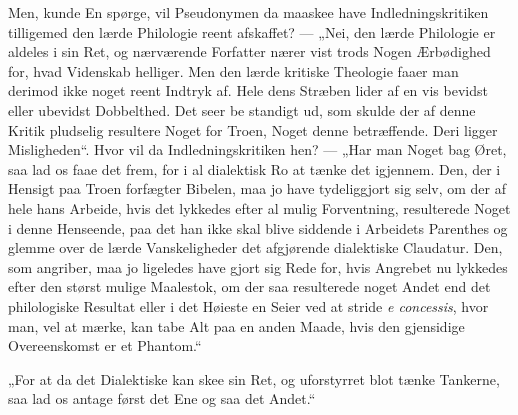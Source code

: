 Men, kunde En spørge, vil Pseudonymen da maaskee have
Indledningskritiken tilligemed den lærde Philologie reent
afskaffet? --- „Nei, den lærde Philologie er aldeles i sin Ret, og
nærværende Forfatter nærer vist trods Nogen Ærbødighed for, hvad
Videnskab helliger. Men den lærde kritiske Theologie faaer man
derimod ikke noget reent Indtryk af. Hele dens Stræben lider af en
vis bevidst eller ubevidst Dobbelthed. Det seer be%
standigt ud, som skulde der af denne Kritik pludselig resultere
Noget for Troen, Noget denne betræffende. Deri ligger
Misligheden“. Hvor vil da Indledningskritiken hen? --- „Har man
Noget bag Øret, saa lad os faae det frem, for i al dialektisk Ro
at tænke det igjennem. Den, der i Hensigt paa Troen forfægter
Bibelen, maa jo have tydeliggjort sig selv, om der af hele hans
Arbeide, hvis det lykkedes efter al mulig Forventning,
resulterede Noget i denne Henseende, paa det han ikke skal blive
siddende i Arbeidets Parenthes og glemme over de lærde
Vanskeligheder det afgjørende dialektiske Claudatur. Den, som
angriber, maa jo ligeledes have gjort sig Rede for, hvis Angrebet
nu lykkedes efter den størst mulige Maalestok, om der saa
resulterede noget Andet end det philologiske Resultat eller i det
Høieste en Seier ved at stride \textit{e concessis}, hvor man, vel
at mærke, kan tabe Alt paa en anden Maade, hvis den gjensidige
Overeenskomst er et Phantom.“

„For at da det Dialektiske kan skee sin Ret, og uforstyrret blot
tænke Tankerne, saa lad os antage først det Ene og saa det
Andet.“

